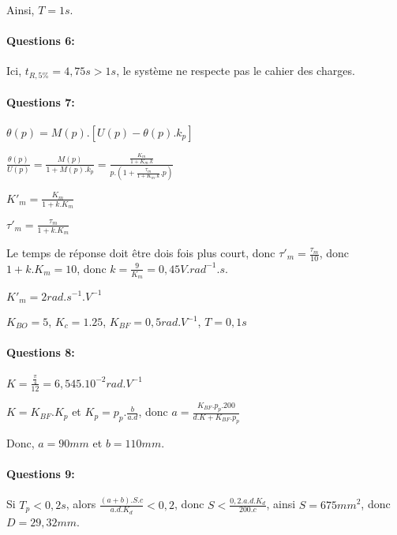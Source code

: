 Ainsi, $T=1s$.

\paragraph{Questions 6:}

Ici, $t_{R,5\%}=4,75s>1s$, le système ne respecte pas le cahier des charges.

\paragraph{Questions 7:}

$\theta(p)=M(p).\left[U(p)-\theta(p).k_p\right]$

$\frac{\theta(p)}{U(p)}=\frac{M(p)}{1+M(p).k_p}=\frac{\frac{K_m}{1+K_m.k}}{p.(1+\frac{\tau_m}{1+K_m.k}.p)}$

$K'_m=\frac{K_m}{1+k.K_m}$

$\tau'_m=\frac{\tau_m}{1+k.K_m}$

Le temps de réponse doit être dois fois plus court, donc $\tau'_m=\frac{\tau_m}{10}$, donc $1+k.K_m=10$, donc $k=\frac{9}{K_m}=0,45V.rad^{-1}.s$.

$K'_m=2rad.s^{-1}.V^{-1}$

$K_{BO}=5$, $K_c=1.25$, $K_{BF}=0,5rad.V^{-1}$, $T=0,1s$

\paragraph{Questions 8:}

$K=\frac{\frac{\pi}{4}}{12}=6,545.10^{-2}rad.V^{-1}$

$K=K_{BF}.K_p$ et $K_p=p_p.\frac{b}{a.d}$, donc  $a=\frac{K_{BF}.p_p.200}{d.K+K_{BF}.p_p}$

Donc, $a=90mm$ et $b=110mm$.

\paragraph{Questions 9:}

Si $T_p<0,2s$, alors $\frac{(a+b).S.c}{a.d.K_d}<0,2$, donc $S<\frac{0,2.a.d.K_d}{200.c}$, ainsi $S=675mm^2$, donc $D=29,32mm$.


